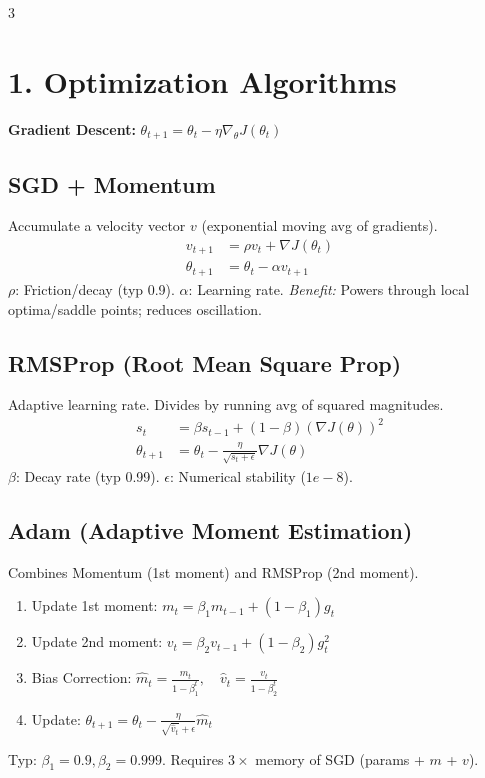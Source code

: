 \documentclass[10pt]{article}
\begin{document}
\scriptsize
\begin{multicols*}{3}

\section*{1. Optimization Algorithms}
\textbf{Gradient Descent:} $\theta_{t+1} = \theta_t - \eta \nabla_\theta J(\theta_t)$

\subsection*{SGD + Momentum}
Accumulate a velocity vector $v$ (exponential moving avg of gradients).
\begin{align*}
    v_{t+1} &= \rho v_t + \nabla J(\theta_t) \\
    \theta_{t+1} &= \theta_t - \alpha v_{t+1}
\end{align*}
$\rho$: Friction/decay (typ 0.9). $\alpha$: Learning rate.
\textit{Benefit:} Powers through local optima/saddle points; reduces oscillation.

\subsection*{RMSProp (Root Mean Square Prop)}
Adaptive learning rate. Divides by running avg of squared magnitudes.
\begin{align*}
    s_{t} &= \beta s_{t-1} + (1-\beta) (\nabla J(\theta))^2 \\
    \theta_{t+1} &= \theta_t - \frac{\eta}{\sqrt{s_t + \epsilon}} \nabla J(\theta)
\end{align*}
$\beta$: Decay rate (typ 0.99). $\epsilon$: Numerical stability ($1e-8$).

\subsection*{Adam (Adaptive Moment Estimation)}
Combines Momentum (1st moment) and RMSProp (2nd moment).
\begin{enumerate}
    \item Update 1st moment: $m_t = \beta_1 m_{t-1} + (1-\beta_1)g_t$
    \item Update 2nd moment: $v_t = \beta_2 v_{t-1} + (1-\beta_2)g_t^2$
    \item Bias Correction: $\hat{m}_t = \frac{m_t}{1-\beta_1^t}, \quad \hat{v}_t = \frac{v_t}{1-\beta_2^t}$
    \item Update: $\theta_{t+1} = \theta_t - \frac{\eta}{\sqrt{\hat{v}_t} + \epsilon} \hat{m}_t$
\end{enumerate}
Typ: $\beta_1=0.9, \beta_2=0.999$. Requires $3\times$ memory of SGD (params + $m$ + $v$).


\end{multicols*}
\end{document}
